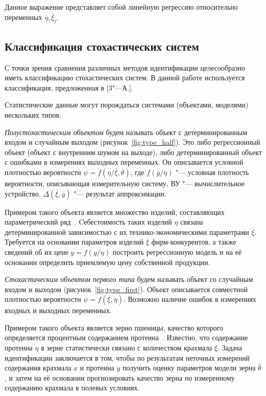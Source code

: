 Данное выражение представляет собой линейную регрессию относительно переменных
\( \overline{\eta}, \overline{\xi}_j \).

\subsection{Классификация стохастических систем}\label{subsec:classification}

С точки зрения сравнения различных методов идентификации целесообразно
иметь классификацию стохастических систем.
В данной работе используется классификация, предложенная в [3"---А.].

Статистические данные могут порождаться системами (объектами, моделями) нескольких типов.

\emph{Полустохастическим объектом} будем называть объект с детерминированным входом и
случайным выходом (рисунок~\ref{fig:type_half}).
Это либо регрессионный объект (объект с внутренним шумом на выходе),
либо детерминированный объект с ошибками в измерениях выходных переменных.
Он описывается условной плотностью вероятности
\( \psi = f(\overline{\eta} / \overline{\xi}, \overline{\theta}) \),
где \( f(\overline{y} / \overline{\eta}) \)
"--- условная плотность вероятности, описывающая измерительную систему,
ВУ "--- вычислительное устройство,
\( \Delta(\overline{\xi}, \overline{y}) \) "--- результат аппроксимации.

Примером такого объекта является множество изделий, составляющих параметрический ряд~\cite{kruchkova02}.
Cебестоимость таких изделий \( \eta \) связана детерминированной зависимостью с
их технико-экономическими параметрами \( \overline{\xi} \).
Требуется на основании параметров изделий \( \overline{\xi} \) фирм-конкурентов,
а также сведений об их цене \( y = f(y / \eta) \) построить регрессионную модель и на её основании
определить приемлемую цену собственной продукции.

\emph{Стохастическим объектом первого типа} будем называть объект со случайным входом и выходом
(рисунок~\ref{fig:type_first}).
Объект описывается совместной плотностью вероятности \( \psi = f(\overline{\xi}, \overline{\eta}) \).
Возможно наличие ошибок в измерениях входных и выходных переменных.

Примером такого объекта является зерно пшеницы,
качество которого определяется процентным содержанием протеина~\cite{ezekiel41}.
Известно, что содержание протеина \( \eta \) в зерне статистически связано с
количеством крахмала \( \xi \).
Задача идентификации заключается в том, чтобы по результатам неточных измерений содержания
крахмала \( x \) и протеина \( y \) получить оценку параметров модели зерна \( \hat{\theta} \),
и затем на её основании прогнозировать качество зерна по измеренному содержанию крахмала в
полевых условиях.

